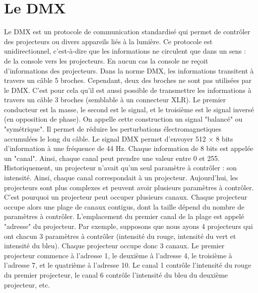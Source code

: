 \section{Le DMX}
\label{sec:dmx}

Le DMX est un protocole de communication standardisé qui permet de contrôler des projecteurs ou divers appareils liés à la lumière.
\newline
Ce protocole est unidirectionnel, c'est-à-dire que les informations ne circulent que dans un sens : de la console vers les projecteurs. En aucun cas la console ne reçoit d'informations des projecteurs.
\newline
\newline
Dans la norme DMX, les informations transitent à travers un câble 5 broches. Cependant, deux des broches ne sont pas utilisées par le DMX. C'est pour cela qu'il est aussi possible de transmettre les informations à travers un câble 3 broches (semblable à un connecteur XLR).
\newline
Le premier conducteur est la masse, le second est le signal, et le troisième est le signal inversé (en opposition de phase). On appelle cette construction un signal "balancé" ou "symétrique". Il permet de réduire les perturbations électromagnetiques accumulées le long du câble.
\newline
\newline
Le signal DMX permet d'envoyer 512 $\times$ 8 bits d'information à une fréquence de 44 Hz.
Chaque information de 8 bits est appelée un "canal". Ainsi, chaque canal peut prendre une valeur entre 0 et 255.
\newline
Historiquement, un projecteur n'avait qu'un seul paramètre à contrôler : son intensité. Ainsi, chaque canal correspondait à un projecteur.
Aujourd'hui, les projecteurs sont plus complexes et peuvent avoir plusieurs paramètres à contrôler. C'est pourquoi un projecteur peut occuper plusieurs canaux.
Chaque projecteur occupe alors une plage de canaux contigus, dont la taille dépend du nombre de paramètres à contrôler. L'emplacement du premier canal de la plage est appelé "adresse" du projecteur.
\newline
Par exemple, supposons que nous ayons 4 projecteurs qui ont chacun 3 paramètres à contrôler (intensité du rouge, intensité du vert et intensité du bleu). Chaque projecteur occupe donc 3 canaux. Le premier projecteur commence à l'adresse 1, le deuxième à l'adresse 4, le troisième à l'adresse 7, et le quatrième à l'adresse 10.
Le canal 1 contrôle l'intensité du rouge du premier projecteur, le canal 6 contrôle l'intensité du bleu du deuxième projecteur, etc.
